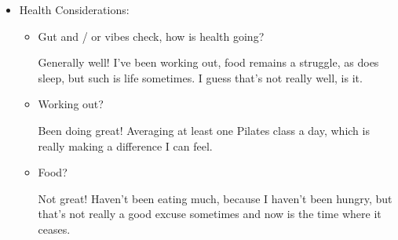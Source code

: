 \documentclass[12pt]{article}
\renewcommand{\,}{\textsuperscript{,}}
\begin{document}
\begin{itemize}
\begin{itemize}
\begin{itemize}
Lots of the major styles (blackwork and Assisi, for example) base a lot on single stitch design. Why don't we try some of that?   
 \end{itemize}  
 \item Other:  
 \begin{itemize}  
 \item Vibe Check: how goes other creation?

Generally well! I have been crocheting more, and I did some cooking/drink making yesterday!

\item Crochet?

Made a ball yesterday!

\item Anything else?

Made a punch recipe and some freestyle drinks yesterday!  
Life hack, a drop or five of liquid smoke makes a non-alcoholic drink taste like a real mocktail.  
Also, different acids \textit{DO} have different flavors.  
That was fun to realize, but now I need to write down what the acid flavors are.\footnote{added to the list}

\end{itemize}  
 \item Upon reflection, how is creation going?

Good!  
 \end{itemize}  
   
 \item Health Considerations:  
 \begin{itemize}  
 \item Gut and / or vibes check, how is health going?

Generally well! I've been working out, food remains a struggle, as does sleep, but such is life sometimes.  
I guess that's not really well, is it.

\item Working out?

Been doing great! Averaging at least one Pilates class a day, which is really making a difference I can feel.

\item Food?

Not great! Haven't been eating much, because I haven't been hungry, but that's not really a good excuse sometimes and now is the time where it ceases.


\end{itemize}
\end{itemize}
\end{document}
